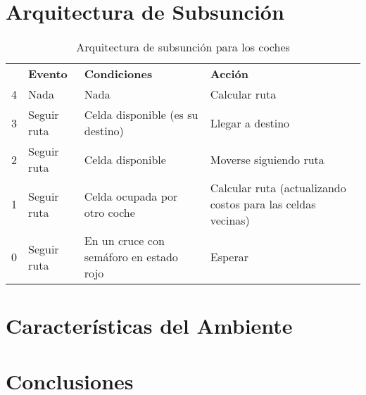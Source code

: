 \documentclass[twoside,11pt]{article}
\begin{document}
\section{Arquitectura de Subsunción}\label{sec:arch}
\begin{table}[ht]
    \centering
    \begin{tabular}{c| >{\raggedright}p{} >{\raggedright}p{} >{\raggedright\arraybackslash}p{}|}
    \cline{2-4}
      & \textbf{Evento} & \textbf{Condiciones} & \textbf{Acción} \\\cline{2-4}
     4 & Nada & Nada & Calcular ruta \\\cline{2-4}
     3 & Seguir ruta & Celda disponible (es su destino)  & Llegar a destino\\\cline{2-4}
     2 & Seguir ruta & Celda disponible & Moverse siguiendo ruta\\\cline{2-4}
     1 & Seguir ruta & Celda ocupada por otro coche & Calcular ruta (actualizando costos para las celdas vecinas)\\\cline{2-4}
     0 & Seguir ruta & En un cruce con semáforo en estado rojo & Esperar \\\cline{2-4}
    \end{tabular}
    \caption{Arquitectura de subsunción para los coches}
    \label{tab:arch}
\end{table}

\section{Características del Ambiente}
\section{Conclusiones}
\end{document}
